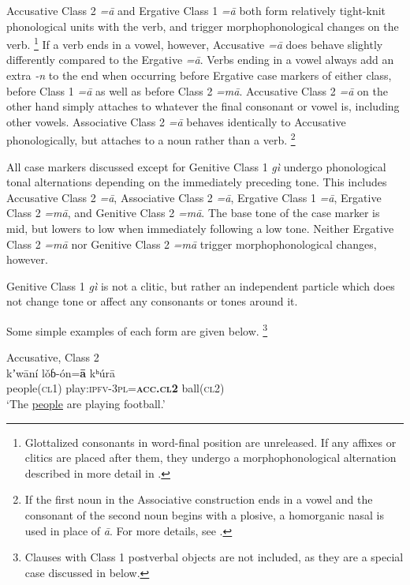 \documentclass[output=collectionpaper,hidelinks]{langscibook}
\theoremstyle{remark}
\begin{document}
Accusative Class 2 \emph{=ā} and Ergative Class 1 \emph{=ā} both form relatively
tight-knit phonological units with the verb, and trigger morphophonological
changes on the verb.%
\footnote{Glottalized consonants in word-final position are
unreleased. If any affixes or clitics are placed after them, they undergo a
morphophonological alternation described in more detail in
\citet[48]{Killian2015}.} %
If a verb ends in a vowel, however, Accusative \emph{=ā} does behave slightly
differently compared to the Ergative \emph{=ā}.  Verbs ending in a vowel always
add an extra \emph{-n} to the end when occurring before Ergative case markers of
either class, before Class 1 \emph{=ā} as well as before Class 2 \emph{=mā}.
Accusative Class 2 \emph{=ā} on the other hand simply attaches to whatever the
final consonant or vowel is, including other vowels.  Associative Class 2
\emph{=ā} behaves identically to Accusative phonologically, but attaches to a
noun rather than a verb.%
\footnote{If the first noun in the Associative construction ends in a vowel and
the consonant of the second noun begins with a plosive, a homorganic nasal is
used in place of \emph{ā}.  For more details, see \citet[89]{Killian2015}.}

All case markers discussed except for Genitive Class 1 \emph{gì} undergo
phonological tonal alternations depending on the immediately preceding tone.
This includes Accusative Class 2 \emph{=ā}, Associative Class 2 \emph{=ā},
Ergative Class 1 \emph{=ā}, Ergative Class 2 \emph{=mā}, and Genitive Class 2
\emph{=mā}.  The base tone of the case marker is mid, but lowers to low when
immediately following a low tone.  Neither Ergative Class 2 \emph{=mā} nor
Genitive Class 2 \emph{=mā} trigger morphophonological changes, however.

Genitive Class 1 \emph{gì} is not a clitic, but rather an independent particle
which does not change tone or affect any consonants or tones around it.

Some simple examples of each form are given below.%
\footnote{Clauses with Class 1
postverbal objects are not included, as they are a special case discussed in
  below.}

\ea
 Accusative, Class 2 \\
\gll kʼwāní lǒɓ-ón=\textbf{ā} kʰúrā \\
 people(\textsc{cl1}) play:\textsc{ipfv}-\textsc{3pl}=\textbf{\textsc{acc.cl2}} ball(\textsc{cl2}) \\
\glt `The \uline{people} are playing football.' \\
\z
\end{document}
